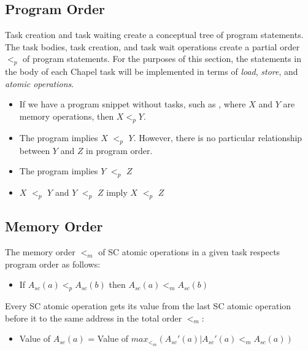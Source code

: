\subsection{Program Order}
\label{program_order}

Task creation and task waiting create a conceptual tree of program
statements.  The task bodies, task creation, and task wait operations
create a partial order $<_p$ of program statements.  For the purposes
of this section, the statements in the body of each Chapel task will
be implemented in terms of \textit{load}, \textit{store}, and
\textit{atomic operations}.

\begin{itemize}
  \item If we have a program snippet without tasks, such as ,
  where $X$ and $Y$ are memory operations, then $X <_p Y$.

  \item The program  implies $X$ $<_p$ $Y$.
  However, there is no particular relationship between $Y$ and $Z$ in
  program order.

  \item The program  implies $Y$ $<_p$ $Z$

  \item $X$ $<_p$ $Y$ and $Y$ $<_p$ $Z$ imply $X$ $<_p$ $Z$

\end{itemize}


\subsection{Memory Order}
\label{memory_order}

The memory order $<_m$ of SC atomic operations in a given task
respects program order as follows:

\begin{itemize}
  \item If $A_{sc}(a)<_pA_{sc}(b)$ then $A_{sc}(a)<_mA_{sc}(b)$
\end{itemize}

Every SC atomic operation gets its value from the last SC atomic
operation before it to the same address in the total order $<_m$:
\begin{itemize}
  \item Value of $A_{sc}(a)$ = Value of
    $max_{<_m} ( A_{sc}'(a)|A_{sc}'(a) <_m A_{sc}(a) ) $
\end{itemize}

